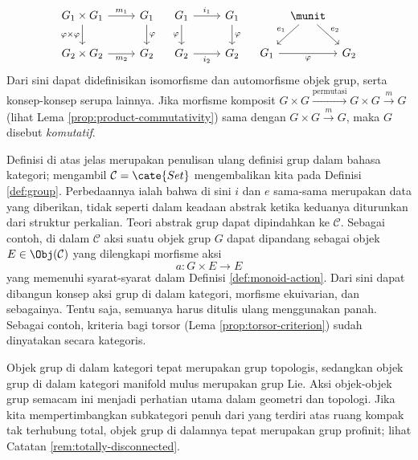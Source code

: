 \begin{definition}
	\[ \begin{tikzcd}
		G_1 \times G_1 \arrow[d, "\varphi \times \varphi"'] \arrow[r, "m_1"] & G_1 \arrow[d, "\varphi"] \\
		G_2 \times G_2 \arrow[r, "m_2"'] & G_2
	\end{tikzcd} \quad \begin{tikzcd}
		G_1 \arrow[r, "i_1"] \arrow[d, "\varphi"'] & G_1 \arrow[d, "\varphi"] \\
		G_2 \arrow[r, "i_2"'] & G_2
	\end{tikzcd} \quad \begin{tikzcd}[column sep=tiny]
		{} & \munit \arrow[ld, "e_1"'] \arrow[rd, "e_2"] & \\
		G_1 \arrow[rr, "\varphi"'] & & G_2
	\end{tikzcd} \]
	Dari sini dapat didefinisikan isomorfisme dan automorfisme objek grup, serta konsep-konsep serupa lainnya. Jika morfisme komposit $G \times G \xrightarrow{\text{permutasi}} G \times G \xrightarrow{m} G$ (lihat Lema \ref{prop:product-commutativity}) sama dengan $G \times G \xrightarrow{m} G$, maka $G$ disebut \emph{komutatif}.
\end{definition}

Definisi di atas jelas merupakan penulisan ulang definisi grup dalam bahasa kategori; mengambil $\mathcal{C} = \cate{Set}$ mengembalikan kita pada Definisi \ref{def:group}. Perbedaannya ialah bahwa di sini $i$ dan $e$ sama-sama merupakan data yang diberikan, tidak seperti dalam keadaan abstrak ketika keduanya diturunkan dari struktur perkalian. Teori abstrak grup dapat dipindahkan ke $\mathcal{C}$. Sebagai contoh, di dalam $\mathcal{C}$ aksi suatu objek grup $G$ dapat dipandang sebagai objek $E \in \Obj(\mathcal{C})$ yang dilengkapi morfisme aksi
\[ a: G \times E \to E \]
yang memenuhi syarat-syarat dalam Definisi \ref{def:monoid-action}. Dari sini dapat dibangun konsep aksi grup di dalam kategori, morfisme ekuivarian, dan sebagainya. Tentu saja, semuanya harus ditulis ulang menggunakan panah. Sebagai contoh, kriteria bagi torsor (Lema \ref{prop:torsor-criterion}) sudah dinyatakan secara kategoris. %

\begin{example}
	Objek grup di dalam kategori  tepat merupakan grup topologis, sedangkan objek grup di dalam kategori manifold mulus merupakan grup Lie. Aksi objek-objek grup semacam ini menjadi perhatian utama dalam geometri dan topologi. Jika kita mempertimbangkan subkategori penuh dari  yang terdiri atas ruang kompak tak terhubung total, objek grup di dalamnya tepat merupakan grup profinit; lihat Catatan \ref{rem:totally-disconnected}.
\end{example}

